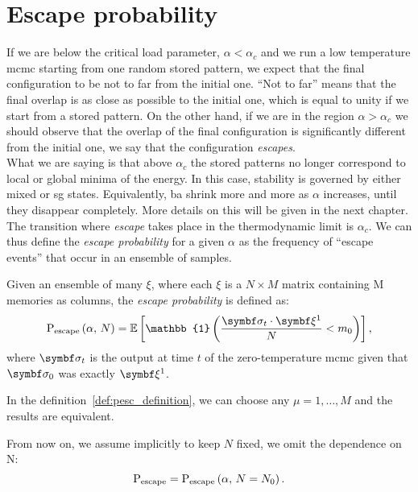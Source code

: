 \documentclass[\rootdir/main.tex]{subfiles}
\begin{document}
\section{Escape probability}
If we are below the critical load parameter, $\alpha < \alpha_c$ and we run a low temperature \acrlong{mcmc} starting from one random stored pattern, we expect that the final configuration to be not to far from the initial one. ``Not to far'' means that the final overlap is as close as possible to the initial one, which is equal to unity if we start from a stored pattern. On the other hand, if we are in the region $\alpha > \alpha_c$ we should observe that the overlap of the final configuration is significantly different from the initial one, we say that the configuration \emph{escapes}.\\
What we are saying is that above $\alpha_c$ the stored patterns no longer correspond to local or global minima of the energy. In this case, stability is governed by either mixed or \acrlong{sg} states. Equivalently, \acrlong{ba} shrink more and more as $\alpha$ increases, until they disappear completely. More details on this will be given in the next chapter.\\
The transition where \emph{escape} takes place in the thermodynamic limit is $\alpha_c$. We can thus define the \emph{escape probability} for a given $\alpha$ as the frequency of ``escape events'' that occur in an ensemble of samples.
\begin{definition}
\label{def:pesc_definition}
Given an ensemble of many $\xi$, where each $\xi$ is a $N \times M$ matrix containing M memories as columns, the \emph{escape probability} is defined as:
\begin{equation}\label{eq:pesc_definition}
    \pescfull = {\mathbb{E}} \left[ \mathbb{1} \left( \frac{\bsigma_{t} \cdot \bxi[1]}{N} < m_0 \right) \right],
\end{equation}
where $\bsigma_t$ is the output at time $t$ of the zero-temperature \acrlong{mcmc} given that $\bsigma_0$ was exactly $\bxi[1]$.
\end{definition}
\begin{remark}
In the definition~\cref{def:pesc_definition}, we can choose any $\mu = 1, \dots, M$ and the results are equivalent.
\end{remark}
From now on, we assume implicitly to keep $N$ fixed, \ie we omit the dependence on N:
\begin{equation*}
     \mathrm{P}_{\text{escape}}  = \mathrm{P}_{\text{escape}} \left(\alpha, \, N = N_0 \right).
\end{equation*}
\end{document}
